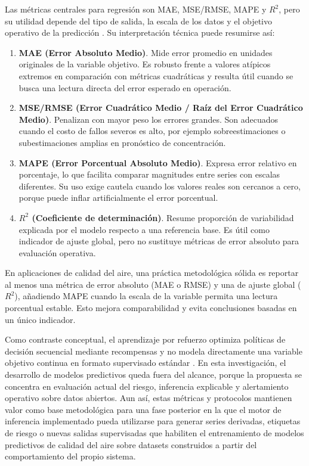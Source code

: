 Las métricas centrales para regresión son MAE, MSE/RMSE, MAPE y \(R^2\), pero su utilidad depende del tipo de salida, la escala de los datos y el objetivo operativo de la predicción \cite{ARTML01}. Su interpretación técnica puede resumirse así:
\begin{enumerate}
\item \textbf{MAE (Error Absoluto Medio)}. Mide error promedio en unidades originales de la variable objetivo. Es robusto frente a valores atípicos extremos en comparación con métricas cuadráticas y resulta útil cuando se busca una lectura directa del error esperado en operación.
\item \textbf{MSE/RMSE (Error Cuadrático Medio / Raíz del Error Cuadrático Medio)}. Penalizan con mayor peso los errores grandes. Son adecuados cuando el costo de fallos severos es alto, por ejemplo sobreestimaciones o subestimaciones amplias en pronóstico de concentración.
\item \textbf{MAPE (Error Porcentual Absoluto Medio)}. Expresa error relativo en porcentaje, lo que facilita comparar magnitudes entre series con escalas diferentes. Su uso exige cautela cuando los valores reales son cercanos a cero, porque puede inflar artificialmente el error porcentual.
\item \textbf{\(R^2\) (Coeficiente de determinación)}. Resume proporción de variabilidad explicada por el modelo respecto a una referencia base. Es útil como indicador de ajuste global, pero no sustituye métricas de error absoluto para evaluación operativa.
\end{enumerate}

En aplicaciones de calidad del aire, una práctica metodológica sólida es reportar al menos una métrica de error absoluto (MAE o RMSE) y una de ajuste global (\(R^2\)), añadiendo MAPE cuando la escala de la variable permita una lectura porcentual estable. Esto mejora comparabilidad y evita conclusiones basadas en un único indicador.

Como contraste conceptual, el aprendizaje por refuerzo optimiza políticas de decisión secuencial mediante recompensas y no modela directamente una variable objetivo continua en formato supervisado estándar \cite{ARTRL01}. En esta investigación, el desarrollo de modelos predictivos queda fuera del alcance, porque la propuesta se concentra en evaluación actual del riesgo, inferencia explicable y alertamiento operativo sobre datos abiertos. Aun así, estas métricas y protocolos mantienen valor como base metodológica para una fase posterior en la que el motor de inferencia implementado pueda utilizarse para generar series derivadas, etiquetas de riesgo o nuevas salidas supervisadas que habiliten el entrenamiento de modelos predictivos de calidad del aire sobre datasets construidos a partir del comportamiento del propio sistema.

